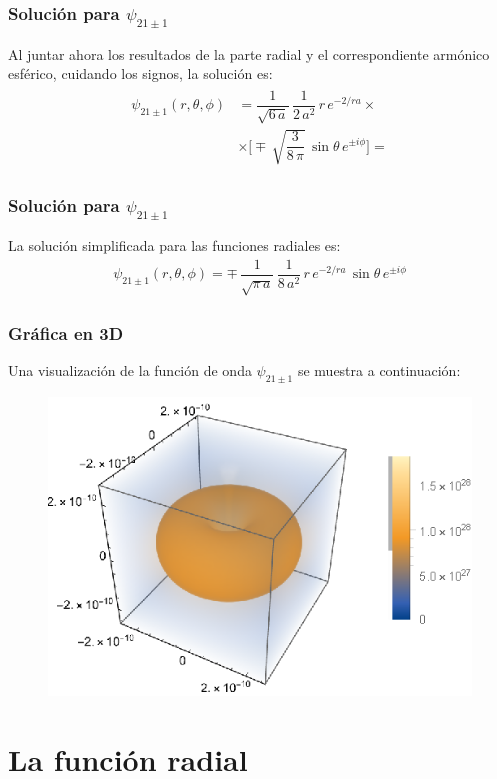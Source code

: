 \documentclass[12pt]{beamer}
\begin{document}
\begin{frame}
\frametitle{Solución para $\psi_{21 \pm 1}$}
Al juntar ahora los resultados de la parte radial y el correspondiente armónico esférico, cuidando los signos, la solución es:
\pause
\begin{eqnarray*}
\begin{aligned}
\psi_{21 \pm 1} (r, \theta, \phi) &= \dfrac{1}{\sqrt{6 \, a}} \, \dfrac{1}{2 \, a^{2}} \, r \, e^{-2/ra} \times \\[0.5em]
&\times \bigg[ \mp \, \sqrt{\dfrac{3}{8 \, \pi}} \, \sin \theta \, e^{\pm i \phi} \bigg]  =
\end{aligned}
\end{eqnarray*}
\end{frame}
\begin{frame}
\frametitle{Solución para $\psi_{21 \pm 1}$}
La solución simplificada para las funciones radiales es:
\pause
\begin{align*}
\psi_{21 \pm 1} (r, \theta, \phi) = \mp \, \dfrac{1}{\sqrt{\pi \, a}} \, \dfrac{1}{8 \, a^{2}} \, r \, e^{-2/ra} \, \sin \theta \, e^{\pm i \phi}
\end{align*}
\end{frame}
\begin{frame}
\frametitle{Gráfica en 3D}
Una visualización de la función de onda $\psi_{21 \pm 1}$ se muestra a continuación:
\pause
\begin{figure}
   \centering
   \includegraphics[scale=1]{Imagenes/Plot_Funcion_Onda_211.eps}
\end{figure}
\end{frame}

\section{La función radial}
\end{document}
